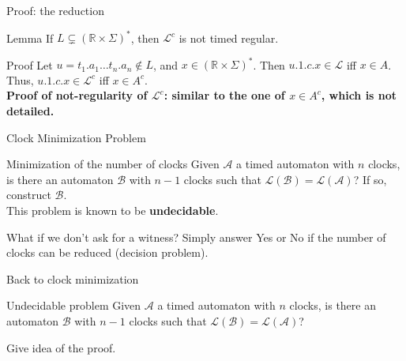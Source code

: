 \begin{frame}{Proof: the reduction}

	\begin{block}{Lemma}
		If $L \subsetneq (\mathbb{R}\times\Sigma)^*$, then $\mathcal{L}^c$ is not timed regular.
	\end{block}
	
	\begin{block}{Proof}
	Let $u = t_1.a_1\dots t_n.a_n \not\in L$, and $x \in (\mathbb{R}\times\Sigma)^*$. Then $u.1.c.x \in \mathcal{L}$ iff $x \in A$. Thus, $u.1.c.x \in \mathcal{L}^c$ iff $x \in A^c$.\\
	\textbf{Proof of not-regularity of $\mathcal{L}^c$: similar to the one of $x \in A^c$, which is not detailed.}
	\end{block}

\end{frame}


\begin{frame}{Clock Minimization Problem}

  \begin{alertblock}{Minimization of the number of clocks}
    Given $\mathcal{A}$ a timed automaton with $n$ clocks, is there an automaton $\mathcal{B}$ with $n-1$ clocks such that $\mathcal{L(B)=L(A)}$? If so, construct $\mathcal{B}$.\\
    This problem is known to be \textbf{undecidable}.
  \end{alertblock}
  \vfill
  \begin{exampleblock}{What if we don't ask for a witness?}
    Simply answer Yes or No if the number of clocks can be reduced (decision problem).
  \end{exampleblock}
    
\end{frame}

\begin{frame}{Back to clock minimization}
  
  \begin{alertblock}{Undecidable problem}
    Given $\mathcal{A}$ a timed automaton with $n$ clocks, is there an automaton $\mathcal{B}$ with $n-1$ clocks such that $\mathcal{L(B)=L(A)}$?
  \end{alertblock}

  Give idea of the proof.
  
\end{frame}
